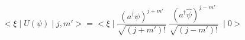 \begin{equation}
<\xi \mid  U(\psi)\mid j,m'> =<\xi\mid \frac{(a^\dag \psi)^{j+m'}}{\sqrt{(j+m')!}}~\frac{(a^\dag \hat{\psi})^{j-m'}}{\sqrt{(j-m')!}}~\mid 0>
\end{equation}

